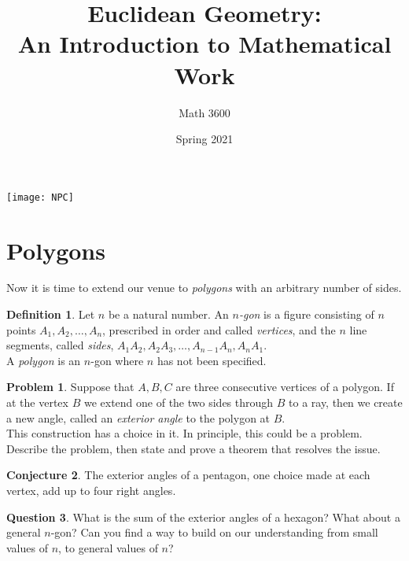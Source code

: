 \documentclass{tufte-handout}
\title{Euclidean Geometry:\\An Introduction to Mathematical Work}
\author[]{Math 3600}
\date{Spring 2021}
\theoremstyle{definition}
\newtheorem{problem}{Problem}[section]
\newtheorem{conjecture}[problem]{Conjecture}
\newtheorem*{definition}{Definition}
\newtheorem{question}[problem]{Question}
\begin{document}
\maketitle
\begin{marginfigure}
    \texttt{[image: NPC]}
\end{marginfigure}

\setcounter{section}{5}

\section{Polygons}
Now it is time to extend our venue to \emph{polygons} with an arbitrary number of sides.

\begin{definition}\label{defn:n-gon}
Let $n$ be a natural number. An \emph{$n$-gon} is a figure consisting of $n$ points $A_1, A_2, \ldots, A_n$, prescribed in order and called \emph{vertices}, and the $n$ line segments, called \emph{sides}, $A_1A_2, A_2A_3, \ldots, A_{n-1}A_n, A_nA_1$.\\
A \emph{polygon} is an $n$-gon where $n$ has not been specified.
\end{definition}



\begin{problem}\label{prob:exterior-angle}
Suppose that $A,B,C$ are three consecutive vertices of a polygon. 
If at the vertex $B$ we extend one of the two sides through $B$ to a ray, then we create a new angle, called an \emph{exterior angle} to the polygon at $B$.\\
This construction has a choice in it. 
In principle, this could be a problem. 
Describe the problem, then state and prove a theorem that resolves the issue.
\end{problem}




\begin{conjecture}\label{conj:ext-angles-pentagon}
The exterior angles of a pentagon, one choice made at each vertex, add up to four right angles.
\end{conjecture}


\begin{question}\label{question-induction}
What is the sum of the exterior angles of a hexagon? 
What about a general $n$-gon? 
Can you find a way to build on our understanding from small values of $n$, to general values of $n$?
\end{question}



\vfill
\end{document}

